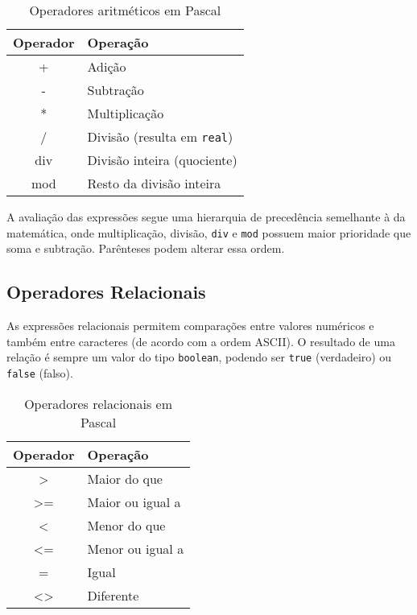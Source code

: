 \documentclass[12pt,a4paper,oneside]{abntex2}
\begin{document}
\begin{table}[H]
    \centering
    \caption{Operadores aritméticos em Pascal}
    \label{tab:aritmeticos}
    \begin{tabular}{|c|l|}
        \hline
        \textbf{Operador} & \textbf{Operação} \\ \hline
        + & Adição \\ \hline
        - & Subtração \\ \hline
        * & Multiplicação \\ \hline
        / & Divisão (resulta em \texttt{real}) \\ \hline
        div & Divisão inteira (quociente) \\ \hline
        mod & Resto da divisão inteira \\ \hline
    \end{tabular}
\end{table}

A avaliação das expressões segue uma hierarquia de precedência semelhante à da matemática, onde multiplicação, divisão, \texttt{div} e \texttt{mod} possuem maior prioridade que soma e subtração. Parênteses podem alterar essa ordem.

\subsection{Operadores Relacionais}
As expressões relacionais permitem comparações entre valores numéricos e também entre caracteres (de acordo com a ordem ASCII). O resultado de uma relação é sempre um valor do tipo \texttt{boolean}, podendo ser \texttt{true} (verdadeiro) ou \texttt{false} (falso).

\begin{table}[H]
    \centering
    \caption{Operadores relacionais em Pascal}
    \label{tab:relacionais}
    \begin{tabular}{|c|l|}
        \hline
        \textbf{Operador} & \textbf{Operação} \\ \hline
        > & Maior do que \\ \hline
        >= & Maior ou igual a \\ \hline
        < & Menor do que \\ \hline
        <= & Menor ou igual a \\ \hline
        = & Igual \\ \hline
        <> & Diferente \\ \hline
    \end{tabular}
\end{table}
\end{document}
